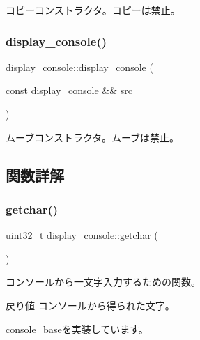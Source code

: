 コピーコンストラクタ。コピーは禁止。 \hypertarget{classdisplay__console_aa8f5d62e558d0dc35877361174040e7c}{}\label{classdisplay__console_aa8f5d62e558d0dc35877361174040e7c} 
\subsubsection{\texorpdfstring{display\+\_\+console()}{display\_console()}\hspace{0.1cm}{\footnotesize\ttfamily [3/3]}}
{\footnotesize\ttfamily display\+\_\+console\+::display\+\_\+console (\begin{DoxyParamCaption}\item[{const \hyperlink{classdisplay__console}{display\+\_\+console} \&\&}]{src }\end{DoxyParamCaption})\hspace{0.3cm}{\ttfamily [delete]}}

ムーブコンストラクタ。ムーブは禁止。 

\subsection{関数詳解}
\hypertarget{classdisplay__console_aca457aab1c95f8fe79b428f9e5b43a51}{}\label{classdisplay__console_aca457aab1c95f8fe79b428f9e5b43a51} 
\subsubsection{\texorpdfstring{getchar()}{getchar()}}
{\footnotesize\ttfamily uint32\+\_\+t display\+\_\+console\+::getchar (\begin{DoxyParamCaption}{ }\end{DoxyParamCaption})\hspace{0.3cm}{\ttfamily [virtual]}}

コンソールから一文字入力するための関数。 \begin{DoxyReturn}{戻り値}
コンソールから得られた文字。 
\end{DoxyReturn}


\hyperlink{classconsole__base_ab06fe008a39c09c60e427946f486833e}{console\+\_\+base}を実装しています。

\hypertarget{classdisplay__console_a516b0f989779241982595e288edab4e1}{}\label{classdisplay__console_a516b0f989779241982595e288edab4e1} 

